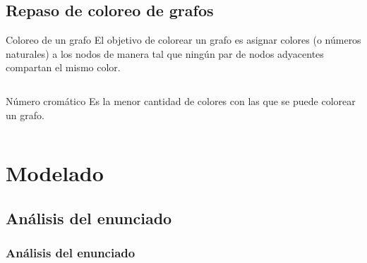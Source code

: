 \documentclass[table,dvipsnames]{beamer}
\begin{document}
\subsection{Repaso de coloreo de grafos}
\begin{frame}
\begin{block}{Coloreo de un grafo}
El objetivo de colorear un grafo es \alert{asignar colores} (o n\'umeros naturales) a los nodos de manera tal que \alert{ning\'un par de nodos adyacentes compartan el mismo color}.
\end{block}

\vspace{10pt}
\begin{columns}
\column{5cm}
\begin{block}{N\'umero crom\'atico}
Es la menor cantidad de colores con las que se puede colorear un grafo.
\end{block}

\column{4cm}
\end{columns}
\end{frame}

\section{Modelado}
\subsection{An\'alisis del enunciado}
\begin{frame}
\frametitle{An\'alisis del enunciado}


\vspace{20pt}

\end{frame}
\end{document}
